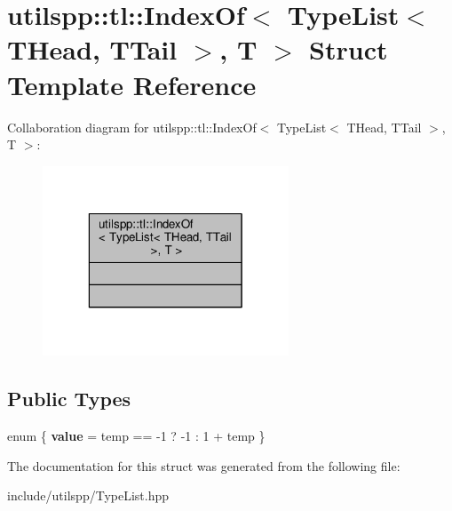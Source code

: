 \hypertarget{structutilspp_1_1tl_1_1IndexOf_3_01TypeList_3_01THead_00_01TTail_01_4_00_01T_01_4}{\section{utilspp\-:\-:tl\-:\-:Index\-Of$<$ Type\-List$<$ T\-Head, T\-Tail $>$, T $>$ Struct Template Reference}
\label{structutilspp_1_1tl_1_1IndexOf_3_01TypeList_3_01THead_00_01TTail_01_4_00_01T_01_4}
}


Collaboration diagram for utilspp\-:\-:tl\-:\-:Index\-Of$<$ Type\-List$<$ T\-Head, T\-Tail $>$, T $>$\-:\nopagebreak
\begin{figure}[H]
\begin{center}
\leavevmode
\includegraphics[width=208pt]{structutilspp_1_1tl_1_1IndexOf_3_01TypeList_3_01THead_00_01TTail_01_4_00_01T_01_4__coll__graph}
\end{center}
\end{figure}
\subsection*{Public Types}
\begin{DoxyCompactItemize}
\item 
enum \{ {\bfseries value} = temp == -\/1 ? -\/1 \-: 1 + temp
 \}
\end{DoxyCompactItemize}


The documentation for this struct was generated from the following file\-:\begin{DoxyCompactItemize}
\item 
include/utilspp/Type\-List.\-hpp\end{DoxyCompactItemize}
